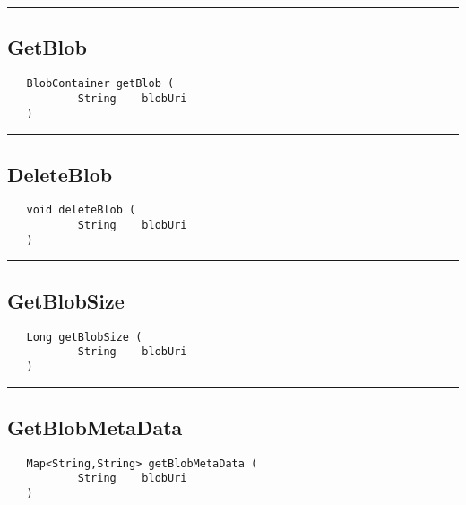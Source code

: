 \rule{15cm}{2pt}
\subsection{GetBlob}
\label{Api:GetBlob}
\begin{verbatim}
   BlobContainer getBlob (
           String    blobUri
   )
\end{verbatim}



\rule{15cm}{2pt}
\subsection{DeleteBlob}
\label{Api:DeleteBlob}
\begin{verbatim}
   void deleteBlob (
           String    blobUri
   )
\end{verbatim}



\rule{15cm}{2pt}
\subsection{GetBlobSize}
\label{Api:GetBlobSize}
\begin{verbatim}
   Long getBlobSize (
           String    blobUri
   )
\end{verbatim}



\rule{15cm}{2pt}
\subsection{GetBlobMetaData}
\label{Api:GetBlobMetaData}
\begin{verbatim}
   Map<String,String> getBlobMetaData (
           String    blobUri
   )
\end{verbatim}



